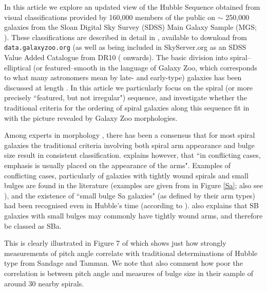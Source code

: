 \documentclass[usenatbib]{mn2e}
\begin{document}
 In this article we explore an updated view of the Hubble Sequence obtained from visual classifications provided by 160,000 members of the public on $\sim$ 250,000 galaxies from the Sloan Digital Sky Survey (SDSS) Main Galaxy Sample (MGS; \citealt{Strauss2002}). These classifications are described in detail in \citep{Willett2013}, available to download from {\tt data.galaxyzoo.org} (as well as being included in SkyServer.org as an SDSS Value Added Catalogue from DR10 (\citealt{DR10} onwards). The basic division into spiral--elliptical (or featured--smooth in the language of Galaxy Zoo, which corresponds to what many astronomers mean by late- and early-type) galaxies has been discussed at length \citep[e.g.][]{Willett2013}. In this article we particularly focus on the spiral (or more precisely ``featured, but not irregular") sequence, and investigate whether the traditional criteria for the ordering of spiral galaxies along this sequence fit in with the picture revealed by Galaxy Zoo morphologies. 

Among experts in morphology \citep[e.g.][]{Sandage2005,Buta2013}, there has been a consensus that for most spiral galaxies the traditional criteria involving both spiral arm appearance and bulge size result in consistent classification. \citet{Buta2013} explains however, that ``in conflicting cases, emphasis is usually placed on the appearance of the arms". Examples of conflicting cases, particularly of galaxies with tightly wound spirals and small bulges are found in the literature (examples are given from \citealt{Hogg1993} in Figure \ref{Sa}; also see \citealt{Sandage1961, SandageBedke1994, Jore1996}), and the existence of ``small bulge Sa galaxies" (as defined by their arm types) had been recognised even in Hubble's time (according to \citealt{Sandage2005}). \citet{Buta2013} also explains that SB galaxies with small bulges may commonly have tightly wound arms, and therefore be classed as SBa. 

This is clearly illustrated in Figure 7 of \citet{kennicutt1981} which shows just how strongly measurements of pitch angle correlate with traditional determinations of Hubble type from Sandage and Tamman. We note that \citet{kennicutt1981} also comment how poor the correlation is between pitch angle and measures of bulge size in their sample of around 30 nearby spirals. 
\end{document}
